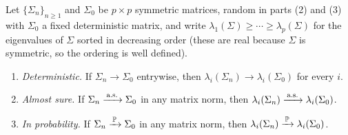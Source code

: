 \begin{proposition}\label{prop:eigen-convergence}
Let \(\{\Sigma_n\}_{n \ge 1}\) and \(\Sigma_0\) be \(p \times p\) symmetric matrices, random in parts (2) and (3) with \(\Sigma_0\) a fixed deterministic matrix, and write \(\lambda_1(\Sigma) \ge \cdots \ge \lambda_p(\Sigma)\) for the eigenvalues of \(\Sigma\) sorted in decreasing order (these are real because \(\Sigma\) is symmetric, so the ordering is well defined).
\begin{enumerate}[label=\textnormal{(\arabic*)},leftmargin=*]
  \item \emph{Deterministic.} If \(\Sigma_n \to \Sigma_0\) entrywise, then \(\lambda_i(\Sigma_n) \to \lambda_i(\Sigma_0)\) for every \(i\).
  \item \emph{Almost sure.} If \(\Sigma_n \xrightarrow{\,\text{a.s.}\,} \Sigma_0\) in any matrix norm, then \(\lambda_i(\Sigma_n) \xrightarrow{\,\text{a.s.}\,} \lambda_i(\Sigma_0)\).
  \item \emph{In probability.} If \(\Sigma_n \xrightarrow{\,\mathbb{P}\,} \Sigma_0\) in any matrix norm, then \(\lambda_i(\Sigma_n) \xrightarrow{\,\mathbb{P}\,} \lambda_i(\Sigma_0)\).
\end{enumerate}
\end{proposition}

